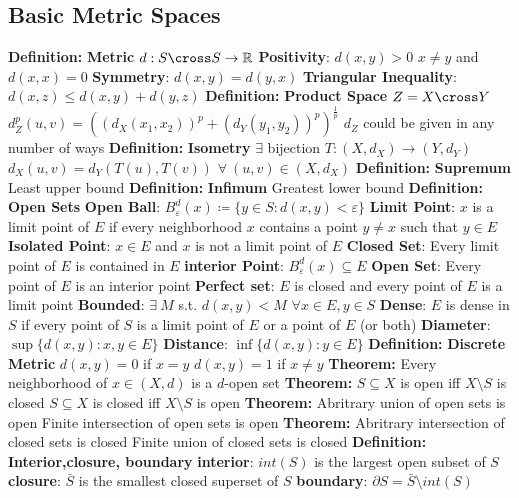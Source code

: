 \documentclass[14pt]{extarticle}
\def\Definition{{\color{blue} \textbf{Definition:} }}
\def\Theorem{{\color{red} \textbf{Theorem:} }}
\begin{document}
\begin{outline}
		\subsection{Basic Metric Spaces}
		\1	\Definition \textbf{Metric}
			\2	$d : S \cross S \rightarrow \mathbb{R}$
			\2	\textbf{Positivity}: $d(x,y) > 0$ $x \ne y$ and $d(x,x) = 0$
			\2	\textbf{Symmetry}: $d(x,y) = d(y,x)$
			\2	\textbf{Triangular Inequality}: $d(x,z) \le d(x,y) + d(y,z)$
		\1	\Definition \textbf{Product Space}
			\2	$Z = X \cross Y$
			\2	$d_Z^p(u,v) = ((d_X(x_1,x_2))^p + (d_Y(y_1,y_2))^p)^{\frac{1}{p}}$
			\2	$d_Z$ could be given in any number of ways
		\1	\Definition \textbf{Isometry}
			\2	$\exists$ bijection $T : (X,d_X) \rightarrow (Y,d_Y)$
			\2	$d_X(u,v) = d_Y(T(u),T(v))$ $\forall~(u,v) \in (X,d_X)$
		\1	\Definition \textbf{Supremum}
			\2	Least upper bound
		\1	\Definition \textbf{Infimum}
			\2	Greatest lower bound
		\1	\Definition \textbf{Open Sets}
			\2	\textbf{Open Ball}: $B_{\varepsilon}^d(x) \coloneqq \{y \in S : d(x,y) < \varepsilon\}$
			\2	\textbf{Limit Point}: $x$ is a limit point of $E$ if every 
						neighborhood $x$ contains a point $y \ne x$ such that $y \in E$
			\2	\textbf{Isolated Point}: $x \in E$ and $x$ is not a limit point of $E$
			\2	\textbf{Closed Set}:  Every limit point of $E$ is contained in $E$
			\2	\textbf{interior Point}: $B_{\varepsilon}^d(x) \subseteq E$
			\2	\textbf{Open Set}: Every point of $E$ is an interior point
			\2	\textbf{Perfect set}: $E$ is closed and every point of $E$ is a limit point
			\2	\textbf{Bounded}: $\exists~M$ s.t. $d(x,y) < M$ $\forall x \in E, y \in S$
			\2	\textbf{Dense}: $E$ is dense in $S$ if every point of $S$ is a limit 
					point of $E$ or a point of $E$ (or both)
			\2	\textbf{Diameter}: $\sup\{d(x,y) : x,y \in E\}$
			\2	\textbf{Distance}: $\inf\{d(x,y) : y \in E\}$
		\1	\Definition \textbf{Discrete Metric}
			\2	$d(x,y) = 0$ if $x = y$
			\2	$d(x,y) = 1$ if $x \ne y$
		\1	\Theorem Every neighborhood of $x \in (X,d)$ is a $d$-open set
		\1	\Theorem $S \subseteq X$ is open iff $X \setminus S$ is closed
			\2 $S \subseteq X$ is closed iff $X \setminus S$ is open
		\1	\Theorem Abritrary union of open sets is open
			\2	Finite intersection of open sets is open
		\1	\Theorem Abritrary intersection of closed sets is closed
			\2	Finite union of closed sets is closed
		\1	\Definition \textbf{Interior,closure, boundary}
			\2	\textbf{interior}: $int(S)$ is the largest open subset of $S$
			\2	\textbf{closure}: $\bar{S}$ is the smallest closed superset of $S$
			\2	\textbf{boundary}: $\partial S = \bar{S} \setminus int(S)$

\end{outline}
\end{document}
